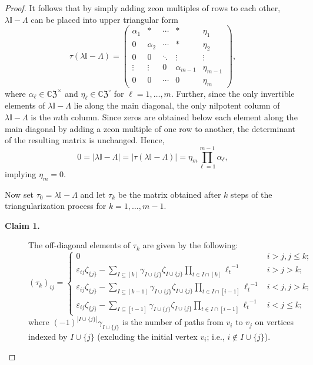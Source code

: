 \documentclass{article}
\theoremstyle{definition}
\newcommand{\CZ}{\mathbb{C}\mathfrak{Z}}
\newcommand{\mI}{\mathbb{I}}
\numberwithin{equation}{section}
\begin{document}
\begin{proof}
It follows that by simply adding zeon multiples of rows to each other, $\lambda\mI-\Lambda$ can be placed into upper triangular form  \begin{equation}\label{triangular form}
\tau(\lambda\mI-\Lambda)=\left(\begin{matrix}
\alpha_1&*&\cdots&*&\eta_1\\
0&\alpha_2&\cdots&*&\eta_2\\
0&0&\ddots&\vdots&\vdots\\
\vdots&\vdots&0&\alpha_{m-1}&\eta_{m-1}\\
0&0&\cdots&0&\eta_m
\end{matrix}\right),  
 \end{equation}
where $\alpha_\ell\in\CZ^\times$ and $\eta_\ell\in\CZ^\circ$ for $\ell=1, \ldots, m$.  Further, since the only invertible elements of $\lambda\mI-\Lambda$ lie along the main diagonal, the only nilpotent column of $\lambda\mI-\Lambda$ is the $m$th column.   Since zeros are obtained below each element along the main diagonal by adding a zeon multiple of one row to another, the determinant of the resulting matrix is unchanged.
Hence, 
\begin{equation*}
0=\vert \lambda\mI-\Lambda\vert=\vert \tau(\lambda\mI-\Lambda)\vert=\eta_m\prod_{\ell=1}^{m-1}\alpha_\ell,
\end{equation*}
implying $\eta_m=0$.


Now set $\tau_0=\lambda\mI-\Lambda$ and let $\tau_k$ be the matrix obtained after $k$ steps of the triangularization process for $k=1, \ldots, m-1$.  

\begin{description}
\item [{\bf Claim 1.}] The off-diagonal elements of $\tau_k$ are given by the following:
\begin{equation}\label{off-diag}
(\tau_k)_{ij}=\begin{cases}
0&  i>j, j\le k;\\
\varepsilon_{ij}\zeta_{\{j\}}-\sum_{I\subseteq [k]}\gamma_{I\cup\{j\}}\zeta_{I\cup\{j\}}\prod_{t\in I\cap[k]}{\ell_t}^{-1}& i > j > k;\\
\varepsilon_{ij}\zeta_{\{j\}}-\sum_{I\subseteq [k-1]}\gamma_{I\cup\{j\}}\zeta_{I\cup\{j\}}\prod_{t\in I\cap[i-1]}{\ell_t}^{-1}&  i< j, j>k;\\
\varepsilon_{ij}\zeta_{\{j\}}-\sum_{I\subseteq [i-1]}\gamma_{I\cup\{j\}}\zeta_{I\cup\{j\}}\prod_{t\in I\cap[i-1]}{\ell_t}^{-1} &i<j\le k;
\end{cases}
\end{equation}where $(-1)^{|I\cup\{j\}|}\gamma_{I\cup\{j\}}$ is the number of paths from $v_i$ to $v_j$ on vertices indexed by $I\cup\{j\}$ (excluding the initial vertex $v_i$; i.e.,  $i\notin I\cup\{j\}$).  
\end{description}


\end{proof}
\end{document}
